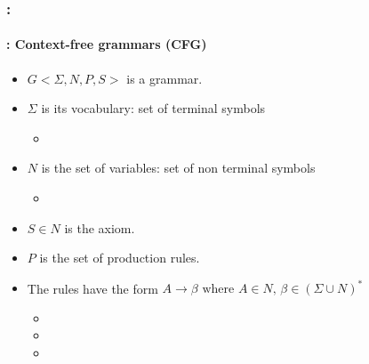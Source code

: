 \documentclass[xcolor=table]{beamer}
\begin{document}
\begin{frame}
	\frametitle{\insertshortsubtitle: \insertsection}
	\framesubtitle{\insertsubsection: Context-free grammars (CFG)}

	\begin{minipage}{.68\textwidth}
	\begin{itemize}
		\item $G <\Sigma, N, P, S>$ is a grammar.
		\item $\Sigma$ is its vocabulary: set of terminal symbols
		\begin{itemize}
			\item {}
		\end{itemize}
		\item $N$ is the set of variables: set of non terminal symbols 
		\begin{itemize}
			\item {}
		\end{itemize}
	\end{itemize}
	\end{minipage}
	\begin{minipage}{.3\textwidth}
	\end{minipage}
	
	\begin{itemize}
		\item $S \in N$ is the axiom.
		\item $P$ is the set of production rules.
		\item The rules have the form $A \rightarrow \beta \text{ where } A \in N,\, \beta \in (\Sigma \cup N)^*$
		\begin{itemize}
			\item {}
			\item {}
			\item {}
		\end{itemize}
	\end{itemize}

\end{frame}
\end{document}
